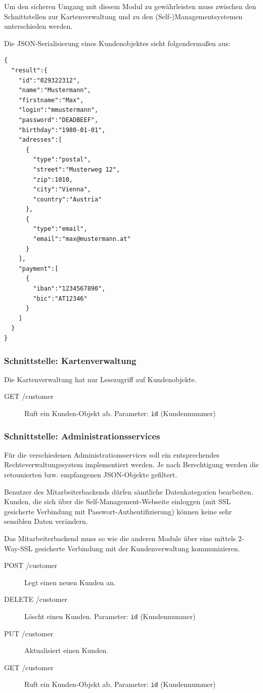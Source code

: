 \documentclass[12pt,a4paper,titlepage,oneside]{scrartcl}
\begin{document}
Um den sicheren Umgang mit diesem Modul zu gewährleisten muss zwischen den Schnittstellen
zur Kartenverwaltung und zu den (Self-)Managementsystemen unterschieden werden.

Die JSON-Serialisierung eines Kundenobjektes sieht folgendermaßen aus:
\begin{lstlisting}
{
  "result":{
    "id":"029322312",
    "name":"Mustermann",
    "firstname":"Max",
    "login":"mmustermann",
    "password":"DEADBEEF",
    "birthday":"1980-01-01",
    "adresses":[
      {
        "type":"postal",
        "street":"Musterweg 12",
        "zip":1010,
        "city":"Vienna",
        "country":"Austria"
      },
      {
        "type":"email",
        "email":"max@mustermann.at"
      }
    ],
    "payment":[
      {
        "iban":"1234567890",
        "bic":"AT12346"
      }
    ]
  }
}
\end{lstlisting}

\subsubsection{Schnittstelle: Kartenverwaltung}
Die Kartenverwaltung hat nur Lesezugriff auf Kundenobjekte.
\begin{description}
\item[GET /customer]
	Ruft ein Kunden-Objekt ab. Parameter: \texttt{id} (Kundennummer)
\end{description}

\subsubsection{Schnittstelle: Administrationsservices}

Für die verschiedenen Administrationsservices soll ein entsprechendes
Rechteverwaltungssystem implementiert werden. Je nach Berechtigung werden die
retounierten bzw. empfangenen JSON-Objekte gefiltert.

Benutzer des Mitarbeiterbackends dürfen sämtliche Datenkategorien bearbeiten.
Kunden, die sich über die Self-Management-Webseite einloggen (mit SSL
gesicherte Verbindung mit Passwort-Authentifizierung) können keine sehr
sensiblen Daten verändern.

Das Mitarbeiterbackend muss so wie die anderen Module über eine mittels 2-Way-SSL
gesicherte Verbindung mit der Kundenverwaltung kommunizieren.

\begin{description}
\item[POST /customer]
	Legt einen neuen Kunden an.

\item[DELETE /customer]
	Löscht einen Kunden. Parameter: \texttt{id} (Kundennummer)

\item[PUT /customer]
	Aktualisiert einen Kunden.

\item[GET /customer]
	Ruft ein Kunden-Objekt ab. Parameter: \texttt{id} (Kundennummer)

\end{description}
\end{document}

